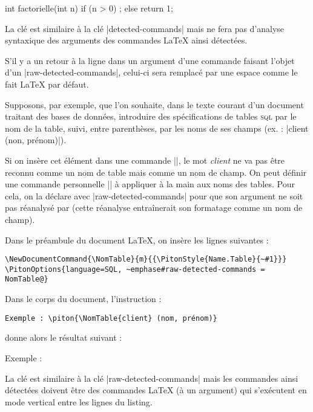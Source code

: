 \documentclass[dvipsnames,svgnames]{article}
\begin{document}
\begin{Piton}[language=C]
int factorielle(int n)
  {
    if (n > 0)  ;
    else return 1;
  }
\end{Piton}

\bigskip
La clé  est similaire à la clé |detected-commands| mais
 ne fera pas d'analyse syntaxique des arguments des commandes LaTeX ainsi
détectées.

S'il y a un retour à la ligne dans un argument d'une commande faisant l'objet d'un
|raw-detected-commands|, celui-ci sera remplacé par une espace comme le fait LaTeX par
défaut. 

\medskip
Supposons, par exemple, que l'on souhaite, dans le texte courant d'un document
traitant des bases de données, introduire des spécifications de tables
\textsc{sql} par le nom de la table, suivi, entre parenthèses, par les noms de
ses champs (ex. : |client (non, prénom)|).

Si on insère cet élément dans une commande |\piton|, le mot \emph{client} ne va pas
être reconnu comme un nom de table mais comme un nom de champ. On peut définir
une commande personnelle |\NomTable|
à appliquer à la main aux noms des tables. Pour cela, on la déclare avec
|raw-detected-commands| pour que son argument ne soit pas réanalysé par 
(cette réanalyse entraînerait son formatage comme un nom de champ).


\medskip
Dans le préambule du document LaTeX, on insère les lignes suivantes :
\begin{Verbatim}
\NewDocumentCommand{\NomTable}{m}{{\PitonStyle{Name.Table}{~#1}}}
\PitonOptions{language=SQL, ~emphase#raw-detected-commands = NomTable@}
\end{Verbatim}

Dans le corps du document, l'instruction :

\begin{Verbatim}
Exemple : \piton{\NomTable{client} (nom, prénom)}
\end{Verbatim}


donne alors le résultat suivant :

\smallskip
\begingroup
{}%
Exemple : 
\endgroup


\bigskip
La clé  est similaire à la clé
|raw-detected-commands| mais les commandes ainsi détectées doivent être des
commandes LaTeX (à un argument) qui s'exécutent en mode vertical entre les lignes
du listing.
\end{document}
